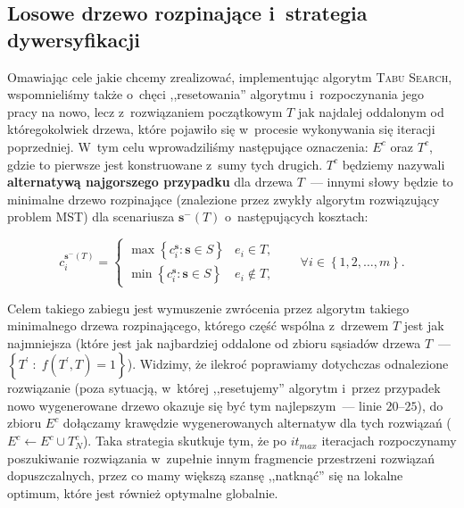 \subsection{Losowe drzewo rozpinające i~strategia dywersyfikacji}



Omawiając cele jakie chcemy zrealizować, implementując algorytm \textsc{Tabu Search}, wspomnieliśmy także o~chęci ,,resetowania'' algorytmu i~rozpoczynania jego pracy na nowo, lecz z~rozwiązaniem początkowym $T$ jak najdalej oddalonym od któregokolwiek drzewa, które pojawiło się w~procesie wykonywania się iteracji poprzedniej.
W~tym celu wprowadziliśmy następujące oznaczenia: $E^{c}$ oraz $T^{c}$, gdzie to pierwsze jest konstruowane z~sumy tych drugich.
$T^{c}$ będziemy nazywali \textbf{alternatywą najgorszego przypadku} dla drzewa $T$~--- innymi słowy będzie to minimalne drzewo rozpinające (znalezione przez zwykły algorytm rozwiązujący problem \textsc{MST}) dla scenariusza $\textbf{s}^{-} \left( T \right)$ o~następujących kosztach:

\begin{equation}
	c^{\textbf{s}^{-} \left( T \right)}_{i} = \left\{
	\begin{matrix}
		\max \left\{ c^{\textbf{s}}_{i} : \textbf{s} \in S \right\} & e_{i} \in T\text{,}\\ 
		\min \left\{ c^{\textbf{s}}_{i} : \textbf{s} \in S \right\} & e_{i} \notin T\text{,}
	\end{matrix}\right. 
	\qquad \forall i \in \left\{ 1, 2, \dots, m \right\}\text{.}
\end{equation}

Celem takiego zabiegu jest wymuszenie zwrócenia przez algorytm takiego minimalnego drzewa rozpinającego, którego część wspólna z~drzewem $T$ jest jak najmniejsza (które jest jak najbardziej oddalone od zbioru sąsiadów drzewa $T$~--- $\left\{ T^{\prime} \; : \; f \left( T^{\prime}, T \right) = 1 \right\}$).
Widzimy, że ilekroć poprawiamy dotychczas odnalezione rozwiązanie (poza sytuacją, w~której ,,resetujemy'' algorytm i~przez przypadek nowo wygenerowane drzewo okazuje się być tym najlepszym~--- linie $20$--$25$), do zbioru $E^{c}$ dołączamy krawędzie wygenerowanych alternatyw dla tych rozwiązań ($E^{c} \leftarrow E^{c} \cup T_{N}^{c}$).
Taka strategia skutkuje tym, że po $it_{max}$ iteracjach rozpoczynamy poszukiwanie rozwiązania w~zupełnie innym fragmencie przestrzeni rozwiązań dopuszczalnych, przez co mamy większą szansę ,,natknąć'' się na lokalne optimum, które jest również optymalne globalnie.


